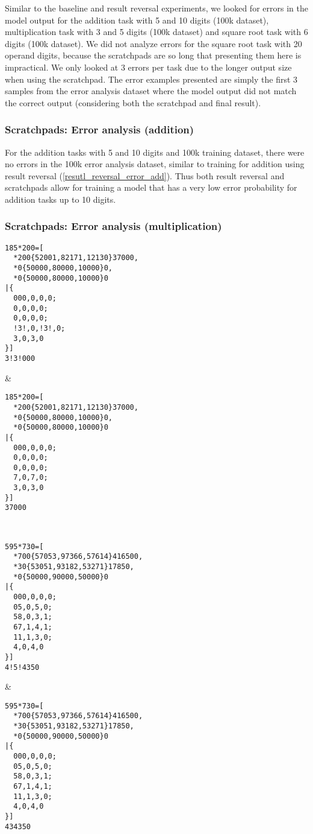 Similar to the baseline and result reversal experiments, we looked for errors in the model output for the addition task with 5 and 10 digits (100k dataset), multiplication task with 3 and 5 digits (100k dataset) and square root task with 6 digits (100k dataset).
We did not analyze errors for the square root task with 20 operand digits, because the scratchpads are so long that presenting them here is impractical.
We only looked at 3 errors per task due to the longer output size when using the scratchpad. The error examples presented are simply the first 3 samples from the error analysis dataset where the model output did not match the correct output (considering both the scratchpad and final result).

\subsubsection{Scratchpads: Error analysis (addition)}

For the addition tasks with 5 and 10 digits and 100k training dataset, there were no errors in the 100k error analysis dataset, similar to training for addition using result reversal (\cref{resutl_reversal_error_add}).
Thus both result reversal and scratchpads allow for training a model that has a very low error probability for addition tasks up to 10 digits.

\subsubsection{Scratchpads: Error analysis (multiplication)}


\ErrorAnalysisTableBegin

\begin{lstlisting}
185*200=[
  *200{52001,82171,12130}37000,
  *0{50000,80000,10000}0,
  *0{50000,80000,10000}0
|{
  000,0,0,0;
  0,0,0,0;
  0,0,0,0;
  !3!,0,!3!,0;
  3,0,3,0
}]
3!3!000
\end{lstlisting} &
\begin{lstlisting}
185*200=[
  *200{52001,82171,12130}37000,
  *0{50000,80000,10000}0,
  *0{50000,80000,10000}0
|{
  000,0,0,0;
  0,0,0,0;
  0,0,0,0;
  7,0,7,0;
  3,0,3,0
}]
37000
\end{lstlisting} \\ \ErrorAnalysisTableRule

\begin{lstlisting}
595*730=[
  *700{57053,97366,57614}416500,
  *30{53051,93182,53271}17850,
  *0{50000,90000,50000}0
|{
  000,0,0,0;
  05,0,5,0;
  58,0,3,1;
  67,1,4,1;
  11,1,3,0;
  4,0,4,0
}]
4!5!4350
\end{lstlisting} &
\begin{lstlisting}
595*730=[
  *700{57053,97366,57614}416500,
  *30{53051,93182,53271}17850,
  *0{50000,90000,50000}0
|{
  000,0,0,0;
  05,0,5,0;
  58,0,3,1;
  67,1,4,1;
  11,1,3,0;
  4,0,4,0
}]
434350
\end{lstlisting} \\ \ErrorAnalysisTableRule

